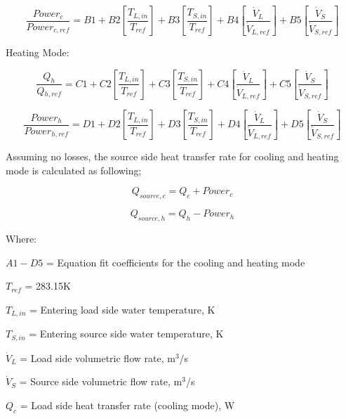\begin{equation}
\frac{{Power{}_c}}{{Power{}_{c,ref}}} = B1 + B2\left[ {\frac{{T{}_{L,in}}}{{T{}_{ref}}}} \right] + B3\left[ {\frac{{T{}_{S,in}}}{{T{}_{ref}}}} \right] + B4\left[ {\frac{{{{\dot V}_L}}}{{{{\dot V}_{L,ref}}}}} \right] + B5\left[ {\frac{{{{\dot V}_S}}}{{{{\dot V}_{S,ref}}}}} \right]
\end{equation}

Heating Mode:

\begin{equation}
\frac{{{Q_h}}}{{Q{}_{h,ref}}} = C1 + C2\left[ {\frac{{T{}_{L,in}}}{{T{}_{ref}}}} \right] + C3\left[ {\frac{{T{}_{S,in}}}{{T{}_{ref}}}} \right] + C4\left[ {\frac{{{{\dot V}_L}}}{{{{\dot V}_{L,ref}}}}} \right] + C5\left[ {\frac{{{{\dot V}_S}}}{{{{\dot V}_{S,ref}}}}} \right]
\end{equation}

\begin{equation}
\frac{{Power{_h}}}{{Power{}_{h,ref}}} = D1 + D2\left[ {\frac{{T{}_{L,in}}}{{T{}_{ref}}}} \right] + D3\left[ {\frac{{T{}_{S,in}}}{{T{}_{ref}}}} \right] + D4\left[ {\frac{{{{\dot V}_L}}}{{{{\dot V}_{L,ref}}}}} \right] + D5\left[ {\frac{{{{\dot V}_S}}}{{{{\dot V}_{S,ref}}}}} \right]
\end{equation}

Assuming no losses, the source side heat transfer rate for cooling and heating mode is calculated as following;

\begin{equation}
{Q_{source,c}} = {Q_c} + Powe{r_c}
\end{equation}

\begin{equation}
{Q_{source,h}} = {Q_h} - Powe{r_h}
\end{equation}

Where:

\(A1 - D5\) = Equation fit coefficients for the cooling and heating mode

\({T_{ref}}\) = 283.15K

\({T_{L,in}}\) = Entering load side water temperature, K

\({T_{S,in}}\) = Entering source side water temperature, K

\({\dot V_L}\) = Load side volumetric flow rate, m\(^{3}\)/s

\({\dot V_S}\) = Source side volumetric flow rate, m\(^{3}\)/s

\({Q_c}\) = Load side heat transfer rate (cooling mode), W

